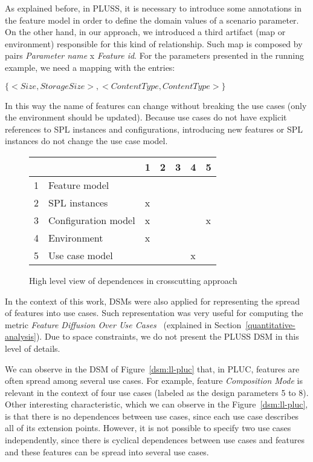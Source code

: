\documentclass{acm_proc_article-sp}
\begin{document}
As explained before, in PLUSS, it is necessary to introduce some annotations in the feature model in 
order to define the domain values of a scenario parameter. On the other hand, in our approach, we introduced 
a third artifact (map or environment) responsible for this kind of relationship. Such map is composed by pairs 
\emph{Parameter name} x \emph{Feature id}. For the parameters presented in the running example, we need 
a mapping with the entries: 

\begin{center}
\small{
$\{<Size, StorageSize>, <ContentType, ContentType>\}$
}
\end{center}

In this way the name of features can 
change without breaking the use cases (only the environment should be
updated). Because use cases do not have explicit references to SPL instances and
configurations, introducing new features or SPL instances do not change the use case model.

\begin{figure}[h]
\centering
\begin{small}
\begin{tabular}{lllllll} \hline
& & 1 & 2 & 3 & 4 & 5 \\ \hline
1 & Feature model 		& 	& 	&      &  	&  	\\ 
2 & SPL instances 		& x 	& 	& 	&   	& 	\\
3 & Configuration model 	& x 	&  	& 	&  	& x	\\
4 & Environment		& x	&	&	&	&  	\\
5 & Use case model 	&  	&  	&  	&  x	& 	\\ \hline
\end{tabular}
\end{small}
\caption{High level view of dependences in crosscutting approach}
\label{dsm:hl-cc}
\end{figure}   

In the context of this work, DSMs were also applied for representing 
the spread of features into use cases. Such representation 
was very useful for computing the metric \emph{Feature Diffusion Over 
Use Cases}~\cite{garcia-taosd-2005} (explained in Section~\ref{quantitative-analysis}).  
Due to space constraints,  we do not present the PLUSS DSM in this level of details. 

We can observe in the DSM of Figure~\ref{dsm:ll-pluc} that, in PLUC, features are often spread among several 
use cases. For example, feature \emph{Composition Mode} is relevant in the context of four use cases
(labeled as the design parameters 5 to 8). Other interesting characteristic, which we can
observe in the Figure~\ref{dsm:ll-pluc}, is that there is no dependences between use cases, since each use
case describes all of its extension points. However, it is not possible to specify two use
cases independently, since there is cyclical dependences between use cases and features
and these features can be spread into several use cases.
\end{document}

